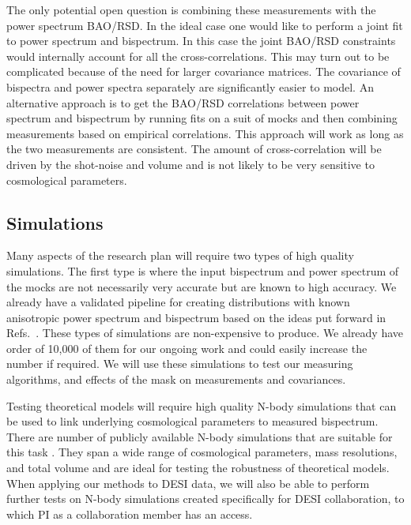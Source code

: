 The only potential open question is combining these measurements with the power
spectrum BAO/RSD. In the ideal case one would like to perform a joint fit to
power spectrum and bispectrum. In this case the joint BAO/RSD constraints would
internally account for all the cross-correlations. This may turn out to be
complicated because of the need for larger covariance matrices. The covariance
of bispectra and power spectra separately are significantly easier to model.
An alternative approach is to get the BAO/RSD correlations between power
spectrum and bispectrum by running fits on a suit of mocks and then combining
measurements based on empirical correlations. This approach will work as long
as the two measurements are consistent. The amount of cross-correlation will
be driven by the shot-noise and volume and is not likely to be very sensitive
to cosmological parameters.

\subsection*{Simulations}

Many aspects of the research plan will require two types of high quality
simulations. The first type is where the input bispectrum and power spectrum of
the mocks are not necessarily very accurate but are known to high accuracy. We
already have a validated pipeline for creating distributions with known
anisotropic power spectrum and bispectrum based on the ideas put forward in
Refs.~\cite{2012PhRvD..85h3002S,2012PhRvD..86l3524R,2010JCAP...10..022W}. These
types of simulations are non-expensive to produce. We already have order of
10,000 of them for our ongoing work and could easily increase the number if
required. We will use these simulations to test our measuring algorithms, and
effects of the mask on measurements and covariances. 

Testing theoretical models will require high quality N-body simulations that
can be used to link underlying cosmological parameters to measured bispectrum.
There are number of publicly available N-body simulations that are suitable for
this task
\cite{2017arXiv171101453K,2005Natur.435..629S,2013AN....334..691R,2016MNRAS.457.4340K,2015JKAS...48..213K,2011JKAS...44..217K,2014arXiv1407.2600S}.
They span a wide range of cosmological parameters, mass resolutions, and total
volume and are ideal for testing the robustness of theoretical models. When
applying our methods to DESI data, we will also be able to perform further
tests on N-body simulations created specifically for DESI collaboration, to
which PI as a collaboration member has an access.

